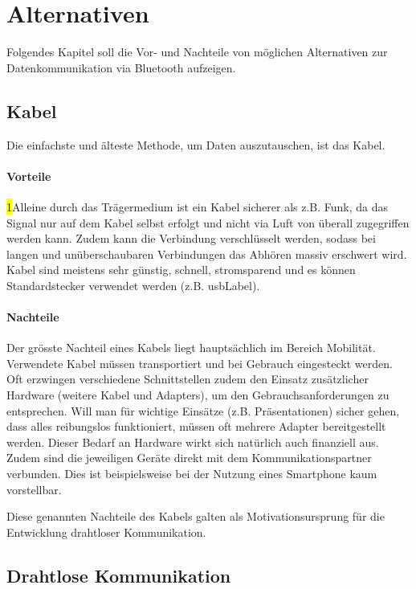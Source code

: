 \chapter{Alternativen}
\label{ch:alt}
Folgendes Kapitel soll die Vor- und Nachteile von möglichen Alternativen zur Datenkommunikation via Bluetooth aufzeigen.

\section{Kabel}
Die einfachste und älteste Methode, um Daten auszutauschen, ist das Kabel.

\subsubsection{Vorteile}
\hl1{Alleine durch das Trägermedium ist ein Kabel sicherer als z.B. Funk, da das Signal nur auf dem Kabel selbst erfolgt und nicht via Luft von überall zugegriffen werden kann.}
Zudem kann die Verbindung verschlüsselt werden, sodass bei langen und unüberschaubaren Verbindungen das Abhören massiv erschwert wird.
Kabel sind meistens sehr günstig, schnell, stromsparend und es können Standardstecker verwendet werden (z.B. \gls{usbLabel}).

\subsubsection{Nachteile}
Der grösste Nachteil eines Kabels liegt hauptsächlich im Bereich Mobilität.
Verwendete Kabel müssen transportiert und bei Gebrauch eingesteckt werden.
Oft erzwingen verschiedene Schnittstellen zudem den Einsatz zusätzlicher Hardware (weitere Kabel und Adapters), um den Gebrauchsanforderungen zu entsprechen.
Will man für wichtige Einsätze (z.B. Präsentationen) sicher gehen, dass alles reibungslos funktioniert, müssen oft mehrere Adapter bereitgestellt werden.
Dieser Bedarf an Hardware wirkt sich natürlich auch finanziell aus.
Zudem sind  die jeweiligen Geräte direkt mit dem Kommunikationspartner verbunden.
Dies ist beispielsweise bei der Nutzung eines Smartphone kaum vorstellbar.

Diese genannten Nachteile des Kabels galten als Motivationsursprung für die Entwicklung drahtloser Kommunikation.

\section{Drahtlose Kommunikation}


